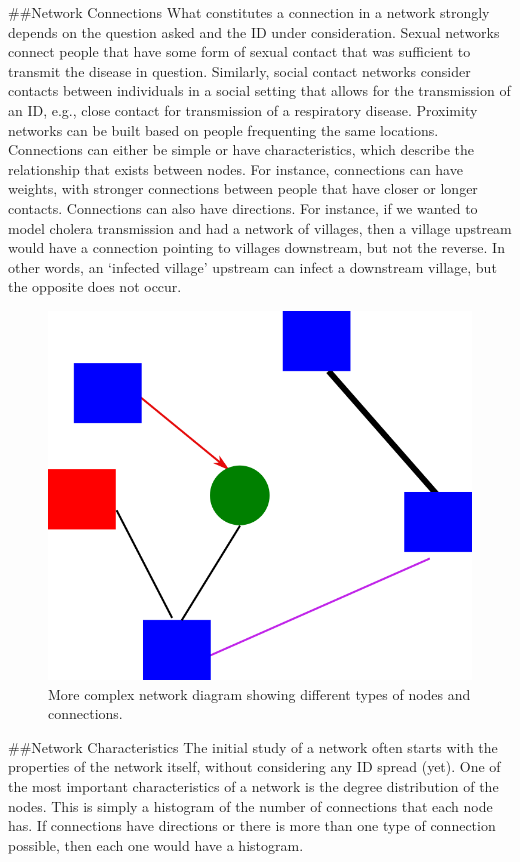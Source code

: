 \documentclass[]{book}
\theoremstyle{definition}
\theoremstyle{definition}
\theoremstyle{definition}
\theoremstyle{remark}
\begin{document}
\#\#Network Connections What constitutes a connection in a network
strongly depends on the question asked and the ID under consideration.
Sexual networks connect people that have some form of sexual contact
that was sufficient to transmit the disease in question. Similarly,
social contact networks consider contacts between individuals in a
social setting that allows for the transmission of an ID, e.g., close
contact for transmission of a respiratory disease. Proximity networks
can be built based on people frequenting the same locations. Connections
can either be simple or have characteristics, which describe the
relationship that exists between nodes. For instance, connections can
have weights, with stronger connections between people that have closer
or longer contacts. Connections can also have directions. For instance,
if we wanted to model cholera transmission and had a network of
villages, then a village upstream would have a connection pointing to
villages downstream, but not the reverse. In other words, an `infected
village' upstream can infect a downstream village, but the opposite does
not occur.

\begin{figure}
\centering
\includegraphics{./images/complex-network-diagram.png}
\caption{More complex network diagram showing different types of nodes
and connections.}
\end{figure}

\#\#Network Characteristics The initial study of a network often starts
with the properties of the network itself, without considering any ID
spread (yet). One of the most important characteristics of a network is
the degree distribution of the nodes. This is simply a histogram of the
number of connections that each node has. If connections have directions
or there is more than one type of connection possible, then each one
would have a histogram.
\end{document}
